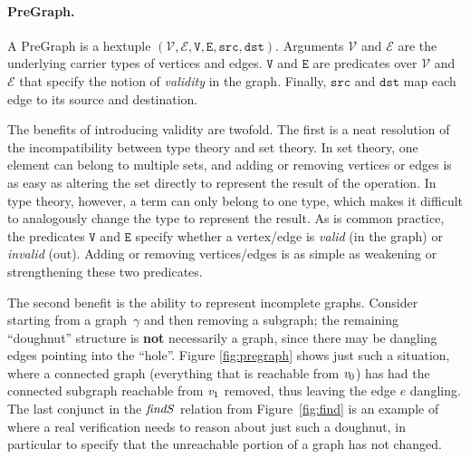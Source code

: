 \documentclass[acmsmall,screen]{acmart}
\newcommand\hide[1]{}
\begin{document}
\hide{The most basic kind of graph is PreGraph, out of which we build
LabeledGraph, and which in turn are used
to build GeneralGraphs. Each kind has some lemmas and also inherits the lemmas of the
previous kind.  The dashed box represents a ``plugin'' system for attaching arbitrary
properties to LabeledGraphs (\ref{subsec:graphplugins}). } 

\paragraph{PreGraph.}
A PreGraph is a hextuple $(\mathcal{V}, \mathcal{E}, \mathtt{V}, \mathtt{E}, \mathtt{src}, \mathtt{dst})$.  Arguments $\mathcal{V}$ and $\mathcal{E}$ are the underlying
carrier types of vertices and edges.  $\mathtt{V}$ and $\mathtt{E}$ are predicates over
$\mathcal{V}$ and $\mathcal{E}$ that specify the notion
of \emph{validity} in the graph.  Finally, $\mathtt{src}$ and $\mathtt{dst}$ map each edge to
its source and destination.


The benefits of introducing validity are twofold. The first is a
neat resolution of the incompatibility between type theory and set theory.
In set theory, one
element can belong to multiple sets, and
adding or removing vertices or edges is as easy as altering
the set directly to represent the result of the operation.
In type theory, however, a term can only belong
to one type, which makes it difficult\hide{if not impossible}
to analogously change the
type to represent the result. As is common practice, the
predicates $\mathtt{V}$ and $\mathtt{E}$ specify whether a vertex/edge is \emph{valid}
(in the graph) or \emph{invalid} (out). Adding or removing vertices/edges
is as simple as weakening or strengthening these two predicates.

The second benefit is the ability to represent incomplete graphs.
Consider starting from a graph~$\gamma$ and then removing a subgraph; the remaining
``doughnut'' structure is \textbf{not} necessarily a graph, since there may be dangling
edges pointing into the ``hole''.  Figure \ref{fig:pregraph} shows just such a situation,
where a connected graph (everything that is reachable from $\mathit{v}_0$) has had the connected
subgraph reachable from $\mathit{v}_1$ removed, thus leaving the edge $e$ dangling.
The last conjunct in the $\mathit{findS}$ relation from Figure~\ref{fig:find} is an example
of where a real verification needs to reason about just such a doughnut, in particular
to specify that the unreachable portion of a graph has not changed.
\end{document}
